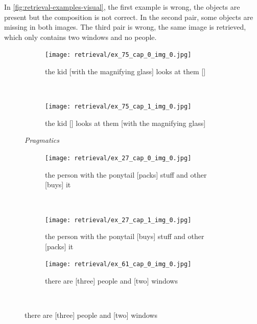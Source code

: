 In \cref{fig:retrieval-examples-visual}, the first example is wrong, the objects are present but the composition is not correct. In the second pair, some objects are missing in both images. The third pair is wrong, the same image is retrieved, which only contains two windows and no people.

\begin{figure}[ht]
\centering
    \begin{minipage}{.30\textwidth}
        \begin{subfigure}{\textwidth}
        \centering
        \texttt{[image: retrieval/ex\_75\_cap\_0\_img\_0.jpg]}
        \caption{\textcolor{BrickRed}{the kid [with the magnifying glass] looks at them [] \xmark}}
        \end{subfigure}\\
        \begin{subfigure}{\textwidth}
        \centering
        \texttt{[image: retrieval/ex\_75\_cap\_1\_img\_0.jpg]}
        \caption{\textcolor{BrickRed}{the kid [] looks at them [with the magnifying glass] \xmark}}
        \end{subfigure}%
        \caption*{\textit{Pragmatics}}
    \end{minipage}
    \hfill
    \begin{minipage}{.30\textwidth}
        \begin{subfigure}{\textwidth}
        \centering
        \texttt{[image: retrieval/ex\_27\_cap\_0\_img\_0.jpg]}
        \caption{\textcolor{BrickRed}{the person with the ponytail [packs] stuff and other [buys] it \xmark}}
        \end{subfigure}\\
        \begin{subfigure}{\textwidth}
        \centering
        \texttt{[image: retrieval/ex\_27\_cap\_1\_img\_0.jpg]}
        \caption{\textcolor{BrickRed}{the person with the ponytail [buys] stuff and other [packs] it \xmark}}
        \end{subfigure}%
        \caption*{\textit{Series}}
    \end{minipage}
    \hfill
    \begin{minipage}{.30\textwidth}
        \begin{subfigure}{\textwidth}
        \centering
        \texttt{[image: retrieval/ex\_61\_cap\_0\_img\_0.jpg]}
        \caption{\textcolor{BrickRed}{there are [three] people and [two] windows \xmark}}
        \end{subfigure}\\

\end{minipage}
\end{figure}
